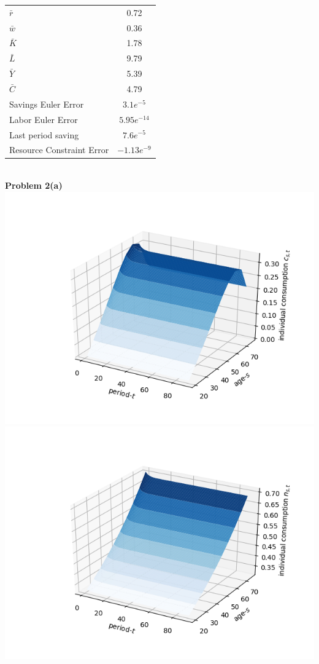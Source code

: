 \documentclass[letterpaper,12pt]{article}
\theoremstyle{definition}
\begin{document}
\begin{table}[htbp!]\centering
\begin{tabular}{|l|c|}\hline
 $\bar{r}$ & 0.72\\
 $\bar{w}$ & 0.36\\
 $\bar{K}$ & 1.78\\
 $\bar{L}$ &9.79\\
 $\bar{Y}$ &5.39\\
 $\bar{C}$ &4.79\\
 Savings Euler Error & $3.1e^{-5}$\\
 Labor Euler Error & $5.95e^{-14}$\\
 Last period saving & $7.6e^{-5}$\\
 Resource Constraint Error & $-1.13e^{-9}$\\ \hline
\end{tabular}
\end{table}
\\
\noindent\textbf{Problem 2(a)}\\
\includegraphics[scale=0.35]{images_TPI/cpath}
\includegraphics[scale=0.35]{images_TPI/npath}
\end{document}
